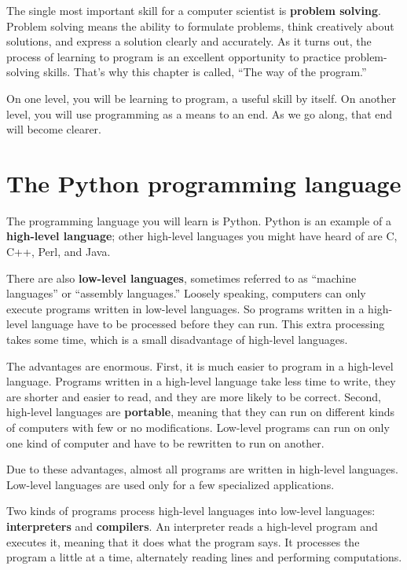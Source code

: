 \documentclass[10pt]{book}
\begin{document}
The single most important skill for a computer scientist is {\bf
problem solving}.  Problem solving means the ability to formulate
problems, think creatively about solutions, and express a solution clearly
and accurately.  As it turns out, the process of learning to program is an
excellent opportunity to practice problem-solving skills.  That's why
this chapter is called, ``The way of the program.''

On one level, you will be learning to program, a useful
skill by itself.  On another level, you will use programming as a means to
an end.  As we go along, that end will become clearer.

\section{The Python programming language}

The programming language you will learn is Python. Python is
an example of a {\bf high-level language}; other high-level languages
you might have heard of are C, C++, Perl, and Java.

There are
also {\bf low-level languages}, sometimes referred to as ``machine
languages'' or ``assembly languages.''  Loosely speaking, computers
can only execute programs written in low-level languages.  So
programs written in a high-level language have to be processed before
they can run.  This extra processing takes some time, which is a small
disadvantage of high-level languages.


The advantages are enormous.  First, it is much easier to program
in a high-level language.  Programs written in a high-level language
take less time to write, they are shorter and easier to read, and they
are more likely to be correct.  Second, high-level languages are {\bf
portable}, meaning that they can run on different kinds of computers
with few or no modifications.  Low-level programs can run on only one
kind of computer and have to be rewritten to run on another.

Due to these advantages, almost all programs are written in high-level
languages.  Low-level languages are used only for a few specialized
applications.


Two kinds of programs process high-level languages
into low-level languages: {\bf interpreters} and {\bf compilers}.
An interpreter reads a high-level program and executes it, meaning that it
does what the program says.  It processes the program a little at a time,
alternately reading lines and performing computations.
\end{document}
